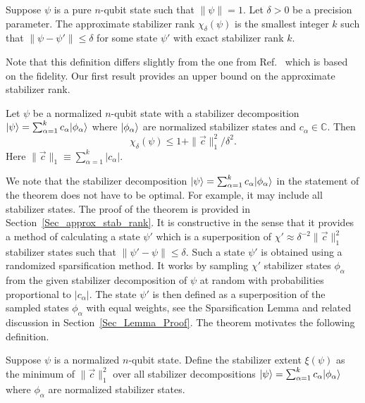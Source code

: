 \begin{dfn}
Suppose $\psi$ is a pure $n$-qubit state such that $\|\psi\|=1$.
Let  $\delta>0$ be a precision parameter.
The approximate stabilizer rank $\chi_\delta(\psi)$ is the smallest integer $k$ such that 
$\| \psi -\psi'\|\le \delta$ for some state $\psi'$ with exact stabilizer rank $k$.
\end{dfn}
\noindent
Note that this definition differs slightly from the one from Ref.~\cite{bravyi2016improved} which is based on the fidelity.
 Our first result provides an upper bound on the approximate stabilizer rank.
\begin{theorem}
\label{thm:randomCvec}
Let $\psi$ be a normalized $n$-qubit state with a stabilizer decomposition 
$\vert\psi\rangle = \sum_{\alpha=1}^k c_\alpha 	|\phi_\alpha\rangle$
where $\vert\phi_\alpha\rangle$ are normalized stabilizer states and $c_\alpha\in \mathbb{C}$.  Then
\begin{equation}
\chi_\delta(\psi) \leq 1+ \| \vec{c} \|_1^2 / \delta^2 .
\end{equation}
Here $\| \vec{c}\|_1 \equiv  \sum_{\alpha=1}^k |c_\alpha|$. 
\end{theorem}	
We note that the stabilizer decomposition $\vert\psi\rangle = \sum_{\alpha=1}^k c_\alpha 
|\phi_\alpha\rangle$
in the statement of the theorem 
does not have to be
optimal. For example,  it may include all  stabilizer states. The proof of the theorem is provided in Section~\ref{Sec_approx_stab_rank}. It is constructive in the sense that it provides a method of calculating
a state $\psi'$ which is a superposition of $\chi'\approx \delta^{-2}  \| \vec{c} \|_1^2$ stabilizer states 
such that $\|\psi'-\psi\|\le \delta$. Such a state $\psi'$ is obtained 
using a randomized sparsification method. It works by sampling
$\chi'$ stabilizer states $\phi_\alpha$ from the given stabilizer decomposition of $\psi$ at random
with probabilities proportional to $|c_\alpha|$. The state $\psi'$ is then defined as
a superposition of the sampled states $\phi_\alpha$ with equal weights, 
see the Sparsification Lemma and related discussion in Section~\ref{Sec_Lemma_Proof}. The theorem motivates the following definition. 
\begin{dfn}
	\label{Cstar_states}
Suppose $\psi$ is a normalized $n$-qubit state. 
Define the stabilizer extent $\xi(\psi)$ as the minimum of $\| \vec{c} \|^2_1$ over all
stabilizer decompositions  $|\psi\rangle=\sum_{\alpha=1}^k c_\alpha |\phi_\alpha\rangle$
where $\phi_\alpha$ are normalized stabilizer states. 
\end{dfn}
